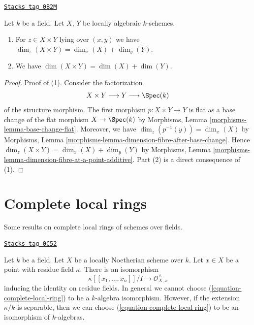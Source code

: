 \begin{lemma}
\label{varieties-lemma-dimension-product-locally-algebraic}
\href{https://stacks.math.columbia.edu/tag/0B2M}{\texttt{Stacks tag 0B2M}}


Let $k$ be a field. Let $X$, $Y$ be locally algebraic $k$-schemes.
\begin{enumerate}
\item For $z \in X \times Y$ lying over $(x, y)$ we have
$\dim_z(X \times Y) = \dim_x(X) + \dim_y(Y)$.
\item We have $\dim(X \times Y) = \dim(X) + \dim(Y)$.
\end{enumerate}
\end{lemma}

\begin{proof}
Proof of (1). Consider the factorization
$$
X \times Y \longrightarrow Y \longrightarrow \Spec(k)
$$
of the structure morphism. The first morphism $p : X \times Y \to Y$
is flat as a base change of the flat morphism $X \to \Spec(k)$
by Morphisms, Lemma \ref{morphisms-lemma-base-change-flat}.
Moreover, we have $\dim_z(p^{-1}(y)) = \dim_x(X)$ by
Morphisms, Lemma \ref{morphisms-lemma-dimension-fibre-after-base-change}.
Hence $\dim_z(X \times Y) = \dim_x(X) + \dim_y(Y)$ by
Morphisms, Lemma \ref{morphisms-lemma-dimension-fibre-at-a-point-additive}.
Part (2) is a direct consequence of (1).
\end{proof}

\section{Complete local rings}
\label{varieties-section-complete-local-rings}
Some results on complete local rings of schemes over fields.

\begin{lemma}
\label{varieties-lemma-complete-local-ring-structure-as-algebra}
\href{https://stacks.math.columbia.edu/tag/0C52}{\texttt{Stacks tag 0C52}}

Let $k$ be a field. Let $X$ be a locally Noetherian scheme over $k$.
Let $x \in X$ be a point with residue field $\kappa$.
There is an isomorphism
\begin{equation}
\label{equation-complete-local-ring}
\kappa[[x_1, \ldots, x_n]]/I \longrightarrow \mathcal{O}_{X, x}^\wedge
\end{equation}
inducing the identity on residue fields.
In general we cannot choose (\ref{equation-complete-local-ring})
to be a $k$-algebra isomorphism. However, if the extension $\kappa/k$
is separable, then we can choose
(\ref{equation-complete-local-ring}) to be an isomorphism of $k$-algebras.
\end{lemma}

